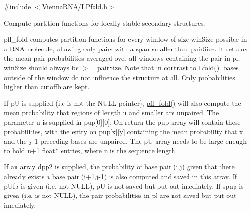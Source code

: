 {\ttfamily \#include $<$\hyperlink{LPfold_8h}{Vienna\+R\+N\+A/\+L\+Pfold.\+h}$>$}



Compute partition functions for locally stable secondary structures. 

pfl\+\_\+fold computes partition functions for every window of size \textquotesingle{}win\+Size\textquotesingle{} possible in a R\+N\+A molecule, allowing only pairs with a span smaller than \textquotesingle{}pair\+Size\textquotesingle{}. It returns the mean pair probabilities averaged over all windows containing the pair in \textquotesingle{}pl\textquotesingle{}. \textquotesingle{}win\+Size\textquotesingle{} should always be $>$= \textquotesingle{}pair\+Size\textquotesingle{}. Note that in contrast to \hyperlink{group__local__mfe__fold_ga16e5a70e60835bb969eaecbe6482f1be}{Lfold()}, bases outside of the window do not influence the structure at all. Only probabilities higher than \textquotesingle{}cutoffb\textquotesingle{} are kept.

If \textquotesingle{}p\+U\textquotesingle{} is supplied (i.\+e is not the N\+U\+L\+L pointer), \hyperlink{group__local__pf__fold_ga7dcf599d07258801ea55e7d14a56908d}{pfl\+\_\+fold()} will also compute the mean probability that regions of length \textquotesingle{}u\textquotesingle{} and smaller are unpaired. The parameter \textquotesingle{}u\textquotesingle{} is supplied in \textquotesingle{}pup\mbox{[}0\mbox{]}\mbox{[}0\mbox{]}\textquotesingle{}. On return the \textquotesingle{}pup\textquotesingle{} array will contain these probabilities, with the entry on \textquotesingle{}pup\mbox{[}x\mbox{]}\mbox{[}y\mbox{]}\textquotesingle{} containing the mean probability that x and the y-\/1 preceding bases are unpaired. The \textquotesingle{}p\+U\textquotesingle{} array needs to be large enough to hold n+1 float$\ast$ entries, where n is the sequence length.

If an array dpp2 is supplied, the probability of base pair (i,j) given that there already exists a base pair (i+1,j-\/1) is also computed and saved in this array. If p\+Ufp is given (i.\+e. not N\+U\+L\+L), p\+U is not saved but put out imediately. If spup is given (i.\+e. is not N\+U\+L\+L), the pair probabilities in pl are not saved but put out imediately.


